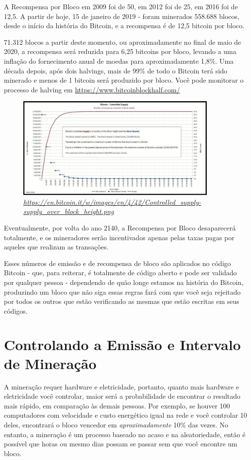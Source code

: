 A Recompensa por Bloco em 2009 foi de 50, em 2012 foi de 25, em 2016 foi de 12,5. A partir de hoje, 15 de janeiro de 2019 - foram minerados 558.688 blocos, desde o início da história do Bitcoin, e a recompensa é de 12,5 bitcoin por bloco.

71.312 blocos a partir deste momento, ou aproximadamente no final de maio de 2020, a recompensa será reduzida para 6,25 bitcoins por bloco, levando a uma inflação do fornecimento anual de moedas para aproximadamente 1,8\%. Uma década depois, após dois halvings, mais de 99\% de todo o Bitcoin terá sido minerado e menos de 1 bitcoin será produzido por bloco. Você pode monitorar o processo de halving em \url{https://www.bitcoinblockhalf.com/}

\begin{figure}[htb]
  \centering
  \includegraphics[width=10cm]{imagens/grafico-capitulo-05.jpg}
  \caption*{\textit{\small \url{https://en.bitcoin.it/w/images/en/4/42/Controlled_supply-supply_over_block_height.png}}}
\end{figure}

Eventualmente, por volta do ano 2140, a Recompensa por Bloco desaparecerá totalmente, e os mineradores serão incentivados apenas pelas taxas pagas por aqueles que realizam as transações.

Esses números de emissão e de recompensa de bloco são aplicados no código Bitcoin - que, para reiterar, é totalmente de código aberto e pode ser validado por qualquer pessoa - dependendo de quão longe estamos na história do Bitcoin, produzindo um bloco que não siga essas regras fará com que você seja rejeitado por todos os outros que estão verificando as mesmas que estão escritas em seus códigos.

\section*{Controlando a Emissão e Intervalo de Mineração}


A mineração requer hardware e eletricidade, portanto, quanto mais hardware e eletricidade você controlar, maior será a probabilidade de encontrar o resultado mais rápido, em comparação às demais pessoas. Por exemplo, se houver 100 computadores com velocidade e custo energético igual na rede e você controlar 10 deles, encontrará o bloco vencedor em \textit{aproximadamente} 10\% das vezes. No entanto, a mineração é um processo baseado no acaso e na aleatoriedade, então é possível que horas ou mesmo dias possam se passar sem que você encontre um bloco.

